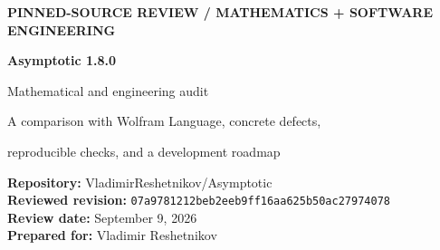 \documentclass[11pt,a4paper]{article}
\newcommand{\commit}{\texttt{07a9781212beb2eeb9ff16aa625b50ac27974078}}
\theoremstyle{remark}\newtheorem{remark}[proposition]{Remark}
\begin{document}
\thispagestyle{empty}
{\sffamily\small\bfseries\color{teal}PINNED-SOURCE REVIEW \quad / \quad MATHEMATICS + SOFTWARE ENGINEERING\par}
\vspace{1.1cm}
{\sffamily\Huge\bfseries\color{navy}Asymptotic 1.8.0\par}
\vspace{0.25cm}
{\sffamily\LARGE\color{navy}Mathematical and engineering audit\par}
\vspace{0.4cm}
{\large A comparison with Wolfram Language, concrete defects,\par reproducible checks, and a development roadmap\par}
\vspace{0.8cm}
\textbf{Repository:} VladimirReshetnikov/Asymptotic\\
\textbf{Reviewed revision:} \commit\\
\textbf{Review date:} September 9, 2026\\
\textbf{Prepared for:} Vladimir Reshetnikov\par
\vspace{0.65cm}
\begin{abstract}
\noindent
The repository is a substantial, specialized extension to Wolfram Language, not a replacement for its asymptotic engine. Its principal contribution is a reusable representation of selected real asymptotic germs: complete blocks with exact real exponents, explicit error scales, source and target branches, retained computation state, and specialized inverse constructions. Much of its value lies in preserving meaning during subsequent operations rather than merely printing an expansion.

This review traces the central power--logarithmic engine and important surrounding layers, compares the design with current official Wolfram documentation, and identifies four particularly actionable issues: a nested-observable real-branch guard bypass; an unbounded eager dense allocation during optional native export; disclosed loss of logarithmic error information in that export; and use of ambient assumptions without reliably recording their provenance. Other findings concern release validation, resource accounting, heterogeneous cutoff semantics, compatibility, and incomplete closure between supported scales.

The accompanying Python checks establish 42 mathematical and allocation-policy assertions. Six further tests exercise the patch generator on synthetic fixtures. Fifteen prospective Wolfram regression tests and a benchmark harness are supplied, but \emph{no native Wolfram execution was available during this review}. Source deductions, independent checks, repository-reported validation, and unexecuted proposals are distinguished throughout.
\end{abstract}
\end{document}

